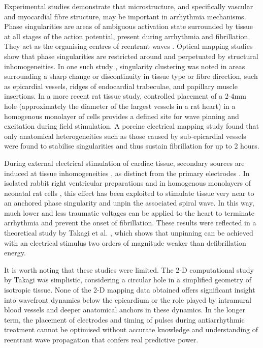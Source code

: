     Experimental studies demonstrate that microstructure, and specifically vascular and myocardial fibre structure, may be important in arrhythmia mechanisms. Phase singularities are areas of ambiguous activation state surrounded by tissue at all stages of the action potential, present during arrhythmia and fibrillation. They act as the organising centres of reentrant waves \cite{Gray:1998p391}. Optical mapping studies show that phase singularities are restricted around and perpetuated by structural inhomogeneities. In one such study \cite{Valderrabano:2003p386}, singularity clustering was noted in areas surrounding a sharp change or discontinuity in tissue type or fibre direction, such as epicardial vessels, ridges of endocardial trabeculae, and papillary muscle insertions.      In a more recent rat tissue study\cite{Cysyk:2008p87}, controlled placement of a 2-4mm hole (approximately the diameter of the largest vessels in a rat heart) in a homogenous monolayer of cells provides a defined site for wave pinning and excitation during field stimulation. A porcine electrical mapping study \cite{Qin:2005p665} found that only anatomical heterogeneities such as those caused by sub-epicardial vessels were found to stabilise singularities and thus sustain fibrillation for up to 2 hours.

    During external electrical stimulation of cardiac tissue, secondary sources are induced at tissue inhomogeneities \cite{Sobie:1997p683}, as distinct from the primary electrodes \cite{Roth:1998p684}. In isolated rabbit right ventricular preparations \cite{Ripplinger:2006p681} and in homogenous monolayers of neonatal rat cells \cite{Cysyk:2008p87}, this effect has been exploited to stimulate tissue very near to an anchored phase singularity and unpin the associated spiral wave. In this way, much lower and less traumatic voltages can be applied to the heart to terminate arrhythmia and prevent the onset of fibrillation. These results were reflected in a theoretical study by Takagi et al. \cite{Takagi:2004p96}, which shows that unpinning can be achieved with an electrical stimulus two orders of magnitude weaker than defibrillation energy.
    
    It is worth noting that these studies were limited. The 2-D computational study by Takagi \cite{Takagi:2004p96} was simplistic, considering a circular hole in a simplified geometry of isotropic tissue. None of the 2-D mapping data obtained offers significant insight into wavefront dynamics below the epicardium or the role played by intramural blood vessels and deeper anatomical anchors in these dynamics. In the longer term, the placement of electrodes and timing of pulses during antiarrhythmic treatment cannot be optimised without accurate knowledge and understanding of reentrant wave propagation that confers real predictive power.
    
